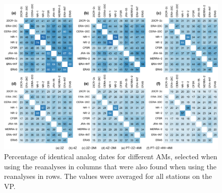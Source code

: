 \documentclass[alpha-refs]{wiley-article}
\begin{document}
\begin{figure}[bt]
	\centering
	\includegraphics[width=120mm]{figure-8.pdf}
	\caption{Percentage of identical analog dates for different AMs, selected when using the reanalyses in columns that were also found when using the reanalyses in rows. The values were averaged for all stations on the VP.}
	\label{fig:shared-dates}
\end{figure}
\end{document}
